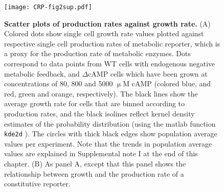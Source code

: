 \clearpage







\begin{figure}
	\centering
	\texttt{[image: CRP-fig2sup.pdf]}
	\caption{ 
	\textbf{Scatter plots of production rates against growth rate.}
	(A) Colored dots show single cell growth rate values plotted against respective single cell production rates of metabolic reporter, which is a proxy for the production rate of metabolic enzymes. 	
	Dots correspond to data points from WT cells with endogenous negative metabolic feedback, and $\Delta$cAMP cells which have been grown at concentrations of 80, 800 and 5000 $\upmu$M cAMP 
	(colored blue, and red, green and orange, respectively).
	The black lines show the average growth rate for cells that are binned according to production rates, and the black isolines reflect kernel density estimates of the probability distribution (using the matlab function \texttt{kde2d} \cite{Botev2010}).
	The circles with thick black edges show population average values per experiment.
	Note that the trends in population average values are explained in Supplemental note I at the end of this chapter.
	(B) As panel A, except that this panel shows the relationship between growth and the production rate of a constitutive reporter. 	
	}
	\label{fig:CRP:fig2sup}
\end{figure}

